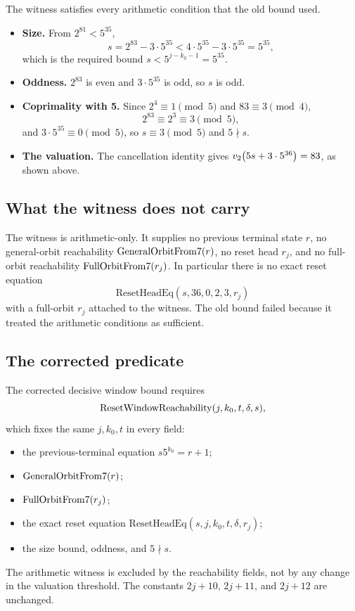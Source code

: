 The witness satisfies every arithmetic condition that the old bound
used.

\begin{itemize}[leftmargin=*]
\item \textbf{Size.}  From $2^{81}<5^{35}$,
  \begin{equation*}
    s=2^{83}-3\cdot5^{35}<4\cdot5^{35}-3\cdot5^{35}=5^{35},
  \end{equation*}
  which is the required bound $s<5^{j-k_0-1}=5^{35}$.
\item \textbf{Oddness.}  $2^{83}$ is even and $3\cdot5^{35}$ is odd,
  so $s$ is odd.
\item \textbf{Coprimality with 5.}  Since $2^4\equiv1\pmod5$ and
  $83\equiv3\pmod4$,
  \begin{equation*}
    2^{83}\equiv2^3\equiv3\pmod5,
  \end{equation*}
  and $3\cdot5^{35}\equiv0\pmod5$, so $s\equiv3\pmod5$ and $5\nmid s$.
\item \textbf{The valuation.}  The cancellation identity gives
  $v_2\!\left(5s+3\cdot5^{36}\right)=83$, as shown above.
\end{itemize}

\subsection{What the witness does not carry}

The witness is arithmetic-only.  It supplies no previous terminal
state $r$, no general-orbit reachability $\mathrm{GeneralOrbitFrom7}(r)$, no reset
head $r_j$, and no full-orbit reachability $\mathrm{FullOrbitFrom7}(r_j)$.  In
particular there is no exact reset equation
\begin{equation*}
  \mathrm{ResetHeadEq}(s,36,0,2,3,r_j)
\end{equation*}
with a full-orbit $r_j$ attached to the witness.  The old bound failed
because it treated the arithmetic conditions as sufficient.

\subsection{The corrected predicate}

The corrected decisive window bound requires
\begin{equation*}
  \mathrm{ResetWindowReachability}(j,k_0,t,\delta,s),
\end{equation*}
which fixes the same $j,k_0,t$ in every field:
\begin{itemize}[leftmargin=*]
\item the previous-terminal equation $s5^{k_0}=r+1$;
\item $\mathrm{GeneralOrbitFrom7}(r)$;
\item $\mathrm{FullOrbitFrom7}(r_j)$;
\item the exact reset equation
  $\mathrm{ResetHeadEq}(s,j,k_0,t,\delta,r_j)$;
\item the size bound, oddness, and $5\nmid s$.
\end{itemize}
The arithmetic witness is excluded by the reachability fields, not by
any change in the valuation threshold.  The constants $2j+10$,
$2j+11$, and $2j+12$ are unchanged.

